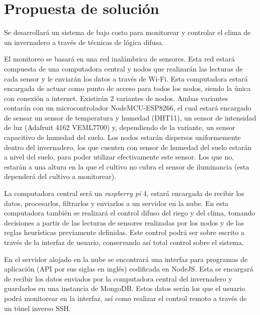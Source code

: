 \section{Propuesta de solución}

Se desarrollará un sistema de bajo costo para monitorear y controlar el clima de un invernadero a través de técnicas de lógica difusa.

El monitoreo se basará en una red inalámbrica de sensores. Esta red estará compuesta de una computadora central y nodos que realizarán las lecturas de cada sensor y le enviarán los datos a través de Wi-Fi. Esta computadora estará encargada de actuar como punto de acceso para todos los nodos, siendo la única con conexión a internet. Existirán 2 variantes de nodos. Ambas variantes contarán con un microcontrolador NodeMCU-ESP8266, el cual estará encargado de sensar un sensor de temperatura y humedad (DHT11), un sensor de intensidad de luz (Adafruit 4162 VEML7700) y, dependiendo de la variante, un sensor capacitivo de humedad del suelo. Los nodos estarán dispersos uniformemente dentro del invernadero, los que cuenten con sensor de humedad del suelo estarán a nivel del suelo, para poder utilizar efectivamente este sensor. Los que no, estarán a una altura en la que el cultivo no cubra el sensor de iluminancia (esta dependerá del cultivo a monitorear). 

La computadora central será un \textit{raspberry pi} 4, estará encargada de recibir los datos, procesarlos, filtrarlos y enviarlos a un servidor en la nube. En esta computadora también se realizará el control difuso del riego y del clima, tomando decisiones a partir de las lecturas de sensores realizadas por los nodos y de las reglas heurísticas previamente definidas. Este control podrá ser sobre escrito a través de la interfaz de usuario, conservando así total control sobre el sistema.

En el servidor alojado en la nube se encontrará una interfaz para programas de aplicación (API por sus siglas en inglés) codificada en NodeJS. Esta se encargará de recibir los datos enviados por la computadora central del invernadero y guardarlos en una instancia de MongoDB. Estos datos serán los que el usuario podrá monitorear en la interfaz, así como realizar el control remoto a través de un túnel inverso SSH.
